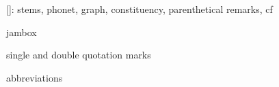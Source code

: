 \ex \cayemph


[]: stems, phonet, graph, constituency, parenthetical remarks, cf

jambox

single and double quotation marks

abbreviations
